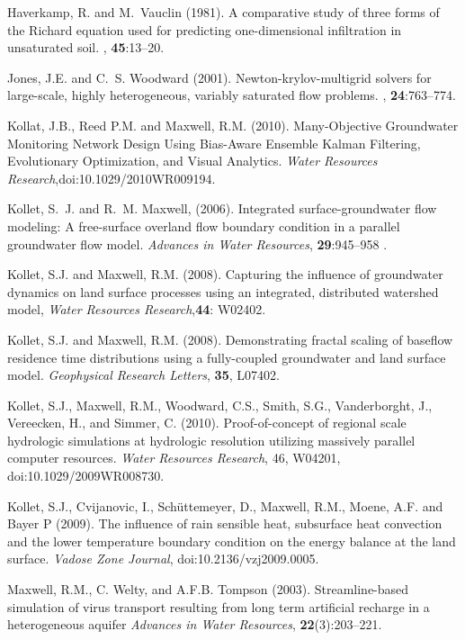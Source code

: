 \begin{thebibliography}{99}
Haverkamp, R. and M.~Vauclin (1981).
\newblock A comparative study of three forms of the {R}ichard equation used for
  predicting one-dimensional infiltration in unsaturated soil.
, {\bf 45}:13--20.


Jones, J.E. and C.~S. Woodward (2001).
\newblock Newton-krylov-multigrid solvers for large-scale, highly heterogeneous, variably saturated flow problems.
, {\bf 24}:763--774.

Kollat, J.B., Reed P.M. and Maxwell, R.M. (2010). Many-Objective Groundwater Monitoring Network Design Using Bias-Aware Ensemble Kalman Filtering, Evolutionary Optimization, and Visual Analytics. {\em Water Resources Research},doi:10.1029/2010WR009194.

Kollet, S.~J. and R.~M. Maxwell, (2006). Integrated
surface-groundwater flow
  modeling: A free-surface overland flow boundary condition in a parallel
  groundwater flow model. {\em Advances in Water Resources}, {\bf 29}:945--958 .

Kollet, S.J. and Maxwell, R.M. (2008). Capturing the influence of groundwater dynamics on land surface processes using an integrated, distributed watershed model, { \em Water Resources Research},{\bf 44}: W02402.

Kollet, S.J. and Maxwell, R.M. (2008). Demonstrating fractal scaling of baseflow residence time distributions using a fully-coupled groundwater and land surface model. {\em Geophysical Research Letters}, {\bf 35}, L07402. 

Kollet, S.J., Maxwell, R.M., Woodward, C.S., Smith, S.G., Vanderborght, J., Vereecken, H., and Simmer, C. (2010). Proof-of-concept of regional scale hydrologic simulations at hydrologic resolution utilizing massively parallel computer resources. {\em Water Resources Research}, 46, W04201, doi:10.1029/2009WR008730.

Kollet, S.J., Cvijanovic, I., Sch{\"u}ttemeyer, D., Maxwell, R.M., Moene, A.F. and Bayer P (2009). The influence of rain sensible heat, subsurface heat convection and the lower temperature boundary condition on the energy balance at the land surface. {\em Vadose Zone Journal}, doi:10.2136/vzj2009.0005.

 Maxwell, R.M., C. Welty, and A.F.B. Tompson (2003).
Streamline-based simulation of virus transport resulting from long term
artificial recharge in a heterogeneous aquifer {\em Advances in Water
Resources}, {\bf 22}(3):203--221.


\end{thebibliography}

